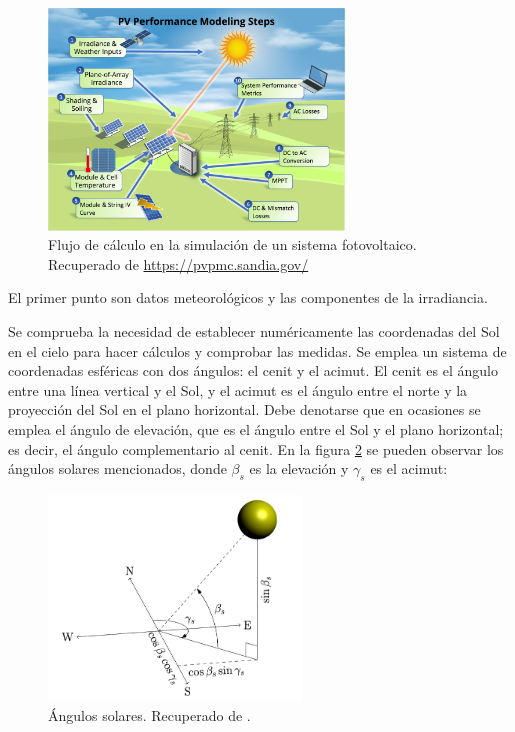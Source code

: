 \begin{figure}[H]
      \centering
      \includegraphics[width=0.7\textwidth]{./images/SoA_irrad/pv_simulation_flow.png}
      \caption{Flujo de cálculo en la simulación de un sistema fotovoltaico. Recuperado de \url{https://pvpmc.sandia.gov/}}
      \label{fig:pv_simulation_flow}
\end{figure}

El primer punto son datos meteorológicos y las componentes de la irradiancia.

Se comprueba la necesidad de establecer numéricamente las coordenadas del Sol en el cielo para hacer cálculos y comprobar las medidas. Se emplea un sistema de \gls{coordenadas esféricas} con dos ángulos: el \gls{cenit} y el \gls{acimut}. El cenit es el ángulo entre una línea vertical y el Sol, y el acimut es el ángulo entre el norte y la proyección del Sol en el plano horizontal. Debe denotarse que en ocasiones se emplea el \gls{ángulo de elevación}, que es el ángulo entre el Sol y el plano horizontal; es decir, el ángulo complementario al cenit. En la figura \ref{fig:solar_angles} se pueden observar los ángulos solares mencionados, donde $\beta_s$ es la elevación y $\gamma_s$ es el acimut:

\begin{figure}[H]
      \centering
      \includegraphics[width=0.6\textwidth]{./images/SoA_irrad/Anderson_Mikofski_Fig2.png}
      \caption{Ángulos solares. Recuperado de \cite[Fig. 2]{Anderson_Mikofski_2020}.}
      \label{fig:solar_angles}
\end{figure}

